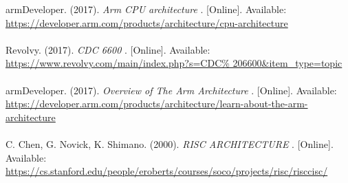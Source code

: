 \documentclass[letterpaper,10pt,onecolumn,compsoc]{IEEEtran}
\begin{document}




		





\newpage

\begin{thebibliography}{4}

armDeveloper. (2017). 
\textit{Arm CPU architecture} 
. [Online]. Available: 
\\\url{https://developer.arm.com/products/architecture/cpu-architecture}
\\ ~ \\
Revolvy. (2017). 
\textit{CDC 6600} 
. [Online]. Available: 
\\\url{https://www.revolvy.com/main/index.php?s=CDC\% 206600&item_type=topic}
\\ ~ \\
armDeveloper. (2017). 
\textit{Overview of The Arm Architecture} 
. [Online]. Available: 
\\\url{https://developer.arm.com/products/architecture/learn-about-the-arm-architecture}
\\ ~ \\
C. Chen, G. Novick, K. Shimano. (2000).
\textit{RISC ARCHITECTURE} 
. [Online]. Available: 
\\\url{https://cs.stanford.edu/people/eroberts/courses/soco/projects/risc/risccisc/}

\end{thebibliography}

\iffalse
\bibitem{first}
F. Author. (year). 
\textit{title} 
. [Online]. Available: 
\\\url{url}
\fi
\end{document}

